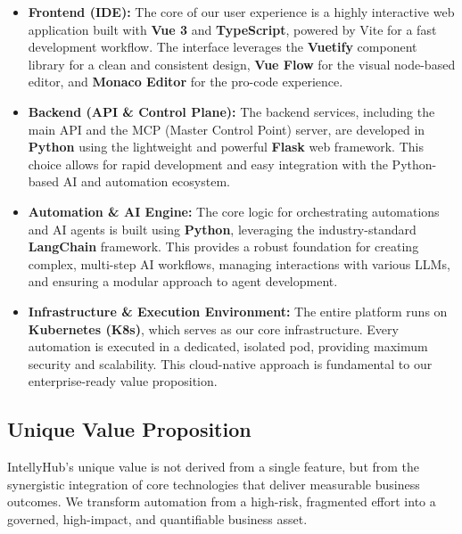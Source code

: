 \documentclass[11pt, a4paper, oneside]{article}
\begin{document}
\begin{itemize}
\item \textbf{Frontend (IDE):} The core of our user experience is a highly interactive web application built with \textbf{Vue 3} and \textbf{TypeScript}, powered by Vite for a fast development workflow. The interface leverages the \textbf{Vuetify} component library for a clean and consistent design, \textbf{Vue Flow} for the visual node-based editor, and \textbf{Monaco Editor} for the pro-code experience.

\item \textbf{Backend (API \& Control Plane):} The backend services, including the main API and the MCP (Master Control Point) server, are developed in \textbf{Python} using the lightweight and powerful \textbf{Flask} web framework. This choice allows for rapid development and easy integration with the Python-based AI and automation ecosystem.

\item \textbf{Automation \& AI Engine:} The core logic for orchestrating automations and AI agents is built using \textbf{Python}, leveraging the industry-standard \textbf{LangChain} framework. This provides a robust foundation for creating complex, multi-step AI workflows, managing interactions with various LLMs, and ensuring a modular approach to agent development.

\item \textbf{Infrastructure \& Execution Environment:} The entire platform runs on \textbf{Kubernetes (K8s)}, which serves as our core infrastructure. Every automation is executed in a dedicated, isolated pod, providing maximum security and scalability. This cloud-native approach is fundamental to our enterprise-ready value proposition.
\end{itemize}

\subsection{Unique Value Proposition}
IntellyHub's unique value is not derived from a single feature, but from the synergistic integration of core technologies that deliver measurable business outcomes. We transform automation from a high-risk, fragmented effort into a governed, high-impact, and quantifiable business asset.
\end{document}
